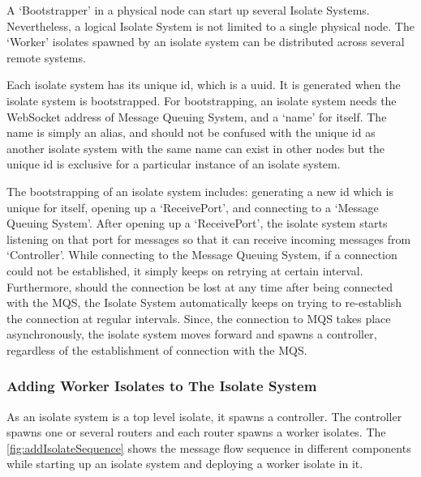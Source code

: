   A ‘Bootstrapper’ in a physical node can start up several Isolate Systems. Nevertheless, a logical Isolate System is not limited to a single physical node. The ‘Worker’ isolates spawned by an isolate system can be distributed across several remote systems.

  Each isolate system has its unique id, which is a \acrshort{uuid}. It is generated when the isolate system is bootstrapped. For bootstrapping, an isolate system needs the WebSocket address of Message Queuing System, and a ‘name’ for itself. The name is simply an alias, and should not be confused with the unique id as another isolate system with the same name can exist in other nodes but the unique id is exclusive for a particular instance of an isolate system.

  The bootstrapping of an isolate system includes: generating a new id which is unique for itself, opening up a ‘ReceivePort’, and connecting to a ‘Message Queuing System’. After opening up a ‘ReceivePort’, the isolate system starts listening on that port for messages so that it can receive incoming messages from ‘Controller’. While connecting to the Message Queuing System, if a connection could not be established, it simply keeps on retrying at certain interval. Furthermore, should the connection be lost at any time after being connected with the MQS, the Isolate System automatically keeps on trying to re-establish the connection at regular intervals. Since, the connection to MQS takes place asynchronously, the isolate system moves forward and spawns a controller, regardless of the establishment of connection with the MQS.

  \subsubsection{Adding Worker Isolates to The Isolate System}
  As an isolate system is a top level isolate, it spawns a controller. The controller spawns one or several routers and each router spawns a worker isolates. The \autoref{fig:addIsolateSequence} shows the message flow sequence in different components while starting up an isolate system and deploying a worker isolate in it.

